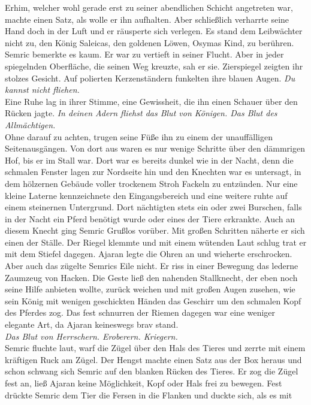 Erhim, welcher wohl gerade erst zu seiner abendlichen Schicht angetreten war, machte einen Satz, 
als wolle er ihn aufhalten. Aber schließlich verharrte seine Hand doch in der Luft und er räusperte 
sich verlegen. Es stand dem Leibwächter nicht zu, den König Saleicas, den goldenen Löwen, Osymas 
Kind, zu berühren. Semric bemerkte es kaum. Er war zu vertieft in seiner Flucht. Aber in jeder 
spiegelnden Oberfläche, die seinen Weg kreuzte, sah er sie. Zierspiegel zeigten ihr stolzes Gesicht. 
Auf polierten Kerzenständern funkelten ihre blauen Augen. \textit{Du kannst nicht fliehen.}\\ 
Eine Ruhe lag in ihrer Stimme, eine Gewissheit, die ihn einen Schauer über den Rücken jagte. 
\textit{In deinen Adern fliehst das Blut von Königen. Das Blut des Allmächtigen.}\\
Ohne darauf zu achten, trugen seine Füße ihn zu einem der unauffälligen Seitenausgängen. Von dort 
aus waren es nur wenige Schritte über den dämmrigen Hof, bis er im Stall war. Dort war es bereits 
dunkel wie in der Nacht, denn die schmalen Fenster lagen zur Nordseite hin und den Knechten war es 
untersagt, in dem hölzernen Gebäude voller trockenem Stroh Fackeln zu entzünden. Nur eine kleine 
Laterne kennzeichnete den Eingangsbereich und eine weitere ruhte auf einem steinernen Untergrund. 
Dort nächtigten stets ein oder zwei Burschen, falls in der Nacht ein Pferd benötigt wurde oder 
eines der Tiere erkrankte. Auch an diesem Knecht ging Semric Grußlos vorüber. Mit großen Schritten 
näherte er sich einen der Ställe. Der Riegel klemmte und mit einem wütenden Laut schlug trat er mit 
dem Stiefel dagegen. Ajaran legte die Ohren an und wieherte erschrocken. Aber auch das zügelte 
Semrics Eile nicht. Er riss in einer Bewegung das lederne Zaumzeug von Hacken. Die Geste ließ den 
nahenden Stallknecht, der eben noch seine Hilfe anbieten wollte, zurück weichen und mit großen Augen 
zusehen, wie sein König mit wenigen geschickten Händen das Geschirr um den schmalen Kopf des Pferdes 
zog. Das fest schnurren der Riemen dagegen war eine weniger elegante Art, da Ajaran keineswegs brav 
stand. \\
\textit{Das Blut von Herrschern. Eroberern. Kriegern.}\\
Semric fluchte laut, warf die Zügel über den Hals des Tieres und zerrte mit einem kräftigen Ruck am 
Zügel. Der Hengst machte einen Satz aus der Box heraus und schon schwang sich Semric auf den blanken 
Rücken des Tieres. Er zog die Zügel fest an, ließ Ajaran keine Möglichkeit, Kopf oder Hals frei zu 
bewegen. Fest drückte Semric dem Tier die Fersen in die Flanken und duckte sich, als es mit 
